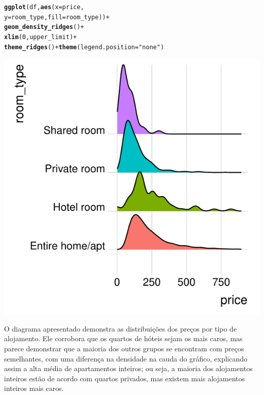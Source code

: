 \documentclass[a4paper, justified]{tufte-handout}\usepackage[]{graphicx}\usepackage[]{xcolor}
\makeatletter
\def\maxwidth{ %
  \ifdim\Gin@nat@width>\linewidth
    \linewidth
  \else
    \Gin@nat@width
  \fi
}
\newcommand{\hlnum}[1]{\textcolor[rgb]{0.686,0.059,0.569}{#1}}%
\newcommand{\hlstr}[1]{\textcolor[rgb]{0.192,0.494,0.8}{#1}}%
\newcommand{\hlopt}[1]{\textcolor[rgb]{0,0,0}{#1}}%
\newcommand{\hlstd}[1]{\textcolor[rgb]{0.345,0.345,0.345}{#1}}%
\newcommand{\hlkwc}[1]{\textcolor[rgb]{0.333,0.667,0.333}{#1}}%
\newcommand{\hlkwd}[1]{\textcolor[rgb]{0.737,0.353,0.396}{\textbf{#1}}}%
\newenvironment{kframe}{%
 \def\at@end@of@kframe{}%
 \ifinner\ifhmode%
  \def\at@end@of@kframe{\end{minipage}}%
  \begin{minipage}{\columnwidth}%
 \fi\fi%
 \def\FrameCommand##1{\hskip\@totalleftmargin \hskip-\fboxsep
 \colorbox{shadecolor}{##1}\hskip-\fboxsep
     \hskip-\linewidth \hskip-\@totalleftmargin \hskip\columnwidth}%
 \MakeFramed {\advance\hsize-\width
   \@totalleftmargin\z@ \linewidth\hsize
   \@setminipage}}%
 {\par\unskip\endMakeFramed%
 \at@end@of@kframe}
\newenvironment{knitrout}{}{} %
\makeatother
\begin{document}
\begin{knitrout}
\color{fgcolor}\begin{kframe}
\begin{alltt}
\hlkwd{ggplot}\hlstd{(df,} \hlkwd{aes}\hlstd{(}\hlkwc{x} \hlstd{= price,}
    \hlkwc{y} \hlstd{= room_type,} \hlkwc{fill} \hlstd{= room_type))} \hlopt{+}
    \hlkwd{geom_density_ridges}\hlstd{()} \hlopt{+}
    \hlkwd{xlim}\hlstd{(}\hlnum{0}\hlstd{, upper_limit)} \hlopt{+}
    \hlkwd{theme_ridges}\hlstd{()} \hlopt{+} \hlkwd{theme}\hlstd{(}\hlkwc{legend.position} \hlstd{=} \hlstr{"none"}\hlstd{)}
\end{alltt}
\end{kframe}\begin{marginfigure}
\includegraphics[width=\maxwidth]{figure/chunk-RoomTypesPrice-1} \end{marginfigure}

\end{knitrout}

O diagrama apresentado demonstra as distribuições dos preços por tipo de alojamento. Ele corrobora que os quartos de hóteis sejam os mais caros, mas parece demonstrar que a maioria dos outros grupos se encontram com preços semelhantes, com uma diferença na densidade na cauda do gráfico, explicando assim a alta média de apartamentos inteiros; ou seja, a maioria dos alojamentos inteiros estão de acordo com quartos privados, mas existem mais alojamentos inteiros mais caros.
\end{document}
